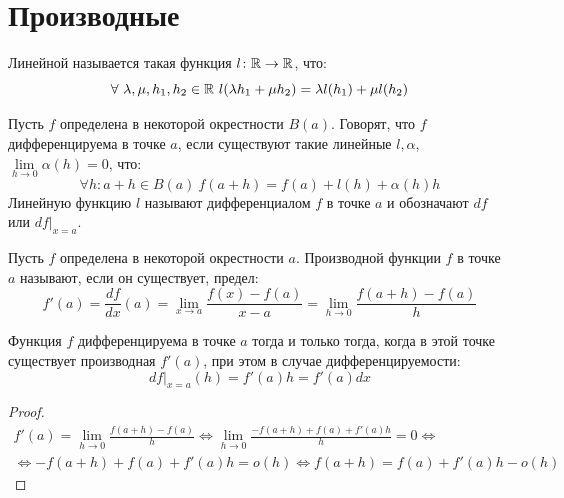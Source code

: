 \documentclass[12pt]{article}
\begin{document}
\section{Производные}

\begin{definition}
	Линейной называется такая функция $l\colon\mathbb{R}\to\mathbb{R}$, что:
	\[\forall\ \lambda, \mu, h_1, h_2\in\mathbb{R}\ l(\lambda h_1+\mu
	h_2)=\lambda l(h_1)+\mu l(h_2)\]
\end{definition}
\begin{definition}
	Пусть $f$ определена в некоторой окрестности $B(a)$. Говорят, что
	$f$ дифференцируема в точке $a$, если существуют такие линейные
	$l,\alpha$, $\lim\limits_{h\to0}\alpha(h)=0$, что:
	\[\forall h\colon a+h\in B(a)\ f(a+h)=f(a)+l(h)+\alpha(h)h\]
	Линейную функцию $l$ называют дифференциалом $f$ в точке $a$
	и обозначают $df$ или $\left.df\right|_{x=a}$.
\end{definition}
\begin{definition}
	Пусть $f$ определена в некоторой окрестности $a$. Производной
	функции $f$ в точке $a$ называют, если он существует, предел:
	\[f'(a)=\frac{df}{dx}(a)=\lim_{x\to
	a}\frac{f(x)-f(a)}{x-a}=\lim_{h\to0}\frac{f(a+h)-f(a)}{h}\]
\end{definition}
\begin{statement}
	Функция $f$ дифференцируема в точке $a$ тогда и только тогда, когда
	в этой точке существует производная $f'(a)$, при этом в случае
	дифференцируемости:
	\[\left.df\right|_{x=a}(h)=f'(a)h=f'(a)dx\]
	\begin{proof}
		\begin{multline*}
			f'(a)=\lim_{h\to0}\frac{f(a+h)-f(a)}{h}\iff
			\lim_{h\to0}\frac{-f(a+h)+f(a)+f'(a)h}{h}=0\iff\\
			\iff -f(a+h)+f(a)+f'(a)h=o(h)\iff f(a+h)=f(a)+f'(a)h-o(h)
		\end{multline*}
	\end{proof}
\end{statement}
\end{document}
